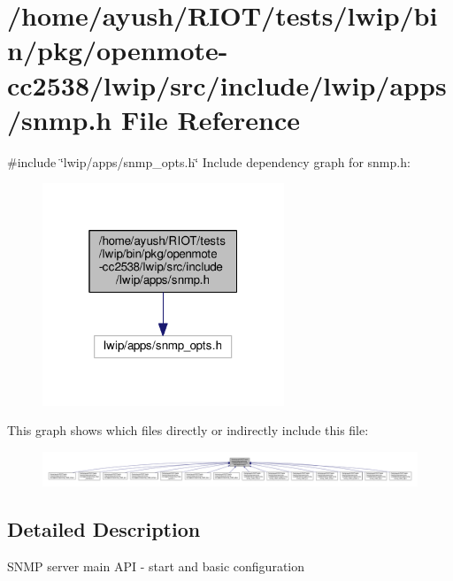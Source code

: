 \hypertarget{openmote-cc2538_2lwip_2src_2include_2lwip_2apps_2snmp_8h}{}\section{/home/ayush/\+R\+I\+O\+T/tests/lwip/bin/pkg/openmote-\/cc2538/lwip/src/include/lwip/apps/snmp.h File Reference}
\label{openmote-cc2538_2lwip_2src_2include_2lwip_2apps_2snmp_8h}
{\ttfamily \#include \char`\"{}lwip/apps/snmp\+\_\+opts.\+h\char`\"{}}\newline
Include dependency graph for snmp.\+h\+:
\nopagebreak
\begin{figure}[H]
\begin{center}
\leavevmode
\includegraphics[width=205pt]{openmote-cc2538_2lwip_2src_2include_2lwip_2apps_2snmp_8h__incl}
\end{center}
\end{figure}
This graph shows which files directly or indirectly include this file\+:
\nopagebreak
\begin{figure}[H]
\begin{center}
\leavevmode
\includegraphics[width=350pt]{openmote-cc2538_2lwip_2src_2include_2lwip_2apps_2snmp_8h__dep__incl}
\end{center}
\end{figure}


\subsection{Detailed Description}
S\+N\+MP server main A\+PI -\/ start and basic configuration 